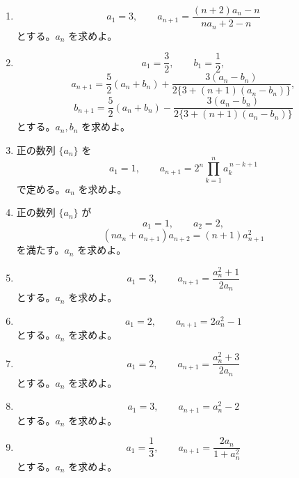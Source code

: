 \begin{enumerate}[label=\textbf{問\arabic*.},leftmargin=3.8em,format=\bookitemlink{practice-advanced}{problem}{answer}]
        \item \[
            a_1=3,\qquad
            a_{n+1}=
            \frac{(n+2)a_n-n}{na_n+2-n}
          \]
              とする。\(a_n\) を求めよ。
        \item \[
            a_1=\frac32,\qquad b_1=\frac12,
          \]
          \[
            a_{n+1}=
            \frac52(a_n+b_n)+
            \frac{3(a_n-b_n)}
            {2\{3+(n+1)(a_n-b_n)\}},
          \]
          \[
            b_{n+1}=
            \frac52(a_n+b_n)-
            \frac{3(a_n-b_n)}
            {2\{3+(n+1)(a_n-b_n)\}}
          \]
              とする。\(a_n,b_n\) を求めよ。
        \item 正の数列 \(\{a_n\}\) を
          \[
            a_1=1,\qquad
            a_{n+1}
            =
            2^n
            \prod_{k=1}^{n}a_k^{\,n-k+1}
          \]
              で定める。\(a_n\) を求めよ。
        \item 正の数列 \(\{a_n\}\) が
          \[
            a_1=1,\qquad a_2=2,
          \]
          \[
            (na_n+a_{n+1})a_{n+2}
            =
            (n+1)a_{n+1}^2
          \]
              を満たす。\(a_n\) を求めよ。
        \item \[
            a_1=3,\qquad
            a_{n+1}=\frac{a_n^2+1}{2a_n}
          \]
              とする。\(a_n\) を求めよ。
        \item \[
            a_1=2,\qquad
            a_{n+1}=2a_n^2-1
          \]
              とする。\(a_n\) を求めよ。
        \item \[
            a_1=2,\qquad
            a_{n+1}=\frac{a_n^2+3}{2a_n}
          \]
              とする。\(a_n\) を求めよ。
        \item \[
            a_1=3,\qquad
            a_{n+1}=a_n^2-2
          \]
              とする。\(a_n\) を求めよ。
        \item \[
            a_1=\frac13,\qquad
            a_{n+1}=\frac{2a_n}{1+a_n^2}
          \]
              とする。\(a_n\) を求めよ。
      \end{enumerate}

